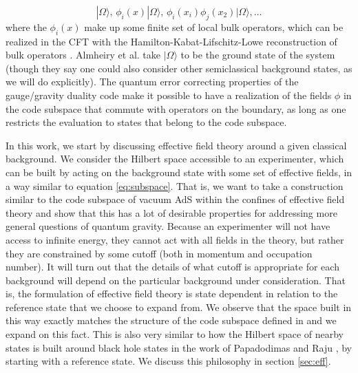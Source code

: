 \documentclass[12pt,nofootinbib, longbibliography]{revtex4-1}
\newcommand\ket[1]{| #1\rangle}
\begin{document}
\begin{equation}
\ket\Omega, \, \phi_i(x) \ket\Omega, \,\phi_i(x_i) \phi_j(x_2) \ket\Omega, \dots \label{eq:subspace}
\end{equation}
where the $\phi_i(x)$ make up some finite set of local bulk operators, which can be realized in the CFT with the Hamilton-Kabat-Lifschitz-Lowe  reconstruction of bulk operators \cite{Hamilton:2005ju}. Almheiry et al. take $\ket\Omega$ to be the ground state of the system (though they say one could also consider other semiclassical background states, as we will do explicitly). The quantum error correcting properties of the gauge/gravity duality code make it possible to have a realization of the fields $\phi$ in the code subspace that commute with operators on the boundary, as long as one restricts the evaluation to states that belong to the code subspace.

In this work, we start by discussing effective field theory around a given classical background. We consider the Hilbert space accessible to an experimenter, which can be built by acting on the background state with some set of effective fields, in a way similar to equation \eqref{eq:subspace}. 
That is, we want to take a construction similar to the code subspace of vacuum AdS within the confines of effective field theory and show that this has a lot of desirable properties for addressing more general questions of quantum gravity.  
Because an experimenter will not have access to infinite energy, they cannot act with all fields in the theory, but rather they are constrained by some cutoff (both in momentum and occupation number). It will turn out that the details of what cutoff is appropriate for each background will depend on the particular background under consideration. That is, the formulation of effective field theory is state dependent in relation to the reference state that we choose to expand from. We observe that the space built in this way exactly matches the structure of the code subspace defined in \cite{Almheiri:2014lwa} and we expand on this fact. This is also very similar to how the Hilbert space of nearby states is built around black hole states in the work of Papadodimas and Raju \cite{Papadodimas:2012aq, Papadodimas:2013jku}, by starting with a reference state. We discuss this philosophy in section \ref{sec:eff}.
\end{document}
